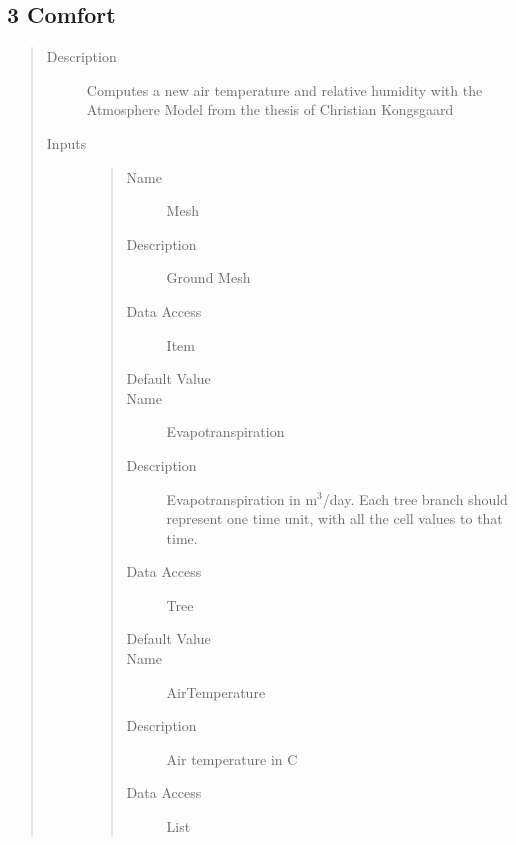 \documentclass[letterpaper,10pt,english]{sphinxmanual}
\begin{document}
\subsection{3 \textbar{} Comfort}
\label{\detokenize{components:comfort}}
\begin{quote}\begin{description}
\item[{Description}] \leavevmode
Computes a new air temperature and relative humidity with the Atmosphere Model from the thesis of Christian Kongsgaard

\item[{Inputs}] \leavevmode\begin{quote}\begin{description}
\item[{Name}] \leavevmode
Mesh

\item[{Description}] \leavevmode
Ground Mesh

\item[{Data Access}] \leavevmode
Item

\item[{Default Value}] \leavevmode
{}

\item[{Name}] \leavevmode
Evapotranspiration

\item[{Description}] \leavevmode
Evapotranspiration in m$^{\text{3}}$/day.
Each tree branch should represent one time unit, with all the cell values to that time.

\item[{Data Access}] \leavevmode
Tree

\item[{Default Value}] \leavevmode
{}

\item[{Name}] \leavevmode
AirTemperature

\item[{Description}] \leavevmode
Air temperature in C

\item[{Data Access}] \leavevmode
List


\end{description}
\end{quote}
\end{description}
\end{quote}
\end{document}
